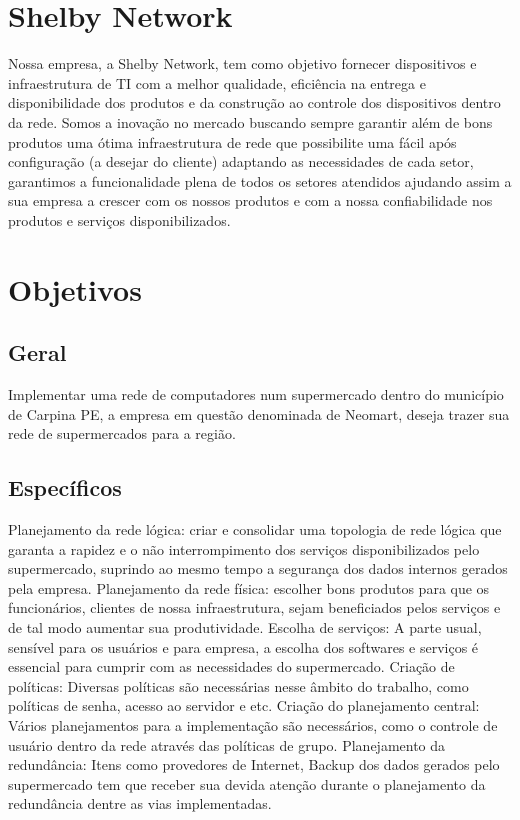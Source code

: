 \documentclass[12pt]{article}
\begin{document}
\section{Shelby Network}
Nossa empresa, a Shelby Network, tem como objetivo fornecer dispositivos e infraestrutura de TI com a melhor qualidade, eficiência na entrega e disponibilidade dos produtos e da construção ao controle dos dispositivos dentro da rede. Somos a inovação no mercado buscando sempre garantir além de bons produtos uma ótima infraestrutura de rede que possibilite uma fácil após configuração (a desejar do cliente) adaptando as necessidades de cada setor, garantimos a funcionalidade plena de todos os setores atendidos ajudando assim a sua empresa a crescer com os nossos produtos e com a nossa confiabilidade nos produtos e serviços disponibilizados.

\section{Objetivos}

\subsection{Geral}
Implementar uma rede de computadores num supermercado dentro do município de Carpina PE, a empresa em questão denominada de Neomart, deseja trazer sua rede de supermercados para a região.

\subsection{Específicos}
Planejamento da rede lógica: criar e consolidar uma topologia de rede lógica que garanta a rapidez e o não interrompimento dos serviços disponibilizados pelo supermercado, suprindo ao mesmo tempo a segurança dos dados internos gerados pela empresa.
Planejamento da rede física: escolher bons produtos para que os funcionários, clientes de nossa infraestrutura, sejam beneficiados pelos serviços e de tal modo aumentar sua produtividade.
Escolha de serviços: A parte usual, sensível para os usuários e para empresa, a escolha dos softwares e serviços é essencial para cumprir com as necessidades do supermercado.
Criação de políticas: Diversas políticas são necessárias nesse âmbito do trabalho, como políticas de senha, acesso ao servidor e etc.
Criação do planejamento central: Vários planejamentos para a implementação são necessários, como o controle de usuário dentro da rede através das políticas de grupo.
Planejamento da redundância: Itens como provedores de Internet, Backup dos dados gerados pelo supermercado tem que receber sua devida atenção durante o planejamento da redundância dentre as vias implementadas.
\end{document}

